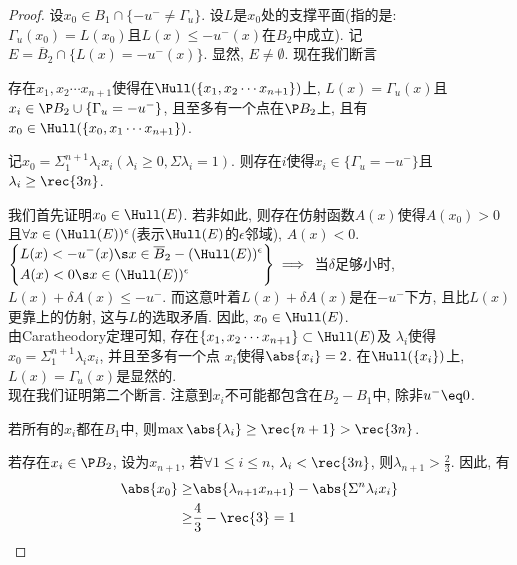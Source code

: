\begin{proof}
    设$x_0 \in B_1 \cap \{-u^- \ne \Gamma_u\}$.  设$L$是$x_0$处的支撑平面(指的是:$\Gamma_u(x_0)=L(x_0)$且$L(x) \le -u^-(x)$在$B_2$中成立).  记$E=\overline{B}_2 \cap \{L(x) =-u^-(x)\}$.  显然, $E \ne \emptyset$.  现在我们断言
    \begin{claim}
        存在$x_1, x_2 \cdots x_{n+1}$使得在$\Hull(\{x_1, x_2\cdots x_{n+1}\})$上, $L(x)=\Gamma_u(x)$且$x_i \in \P B_2 \cup \{\Gamma_u = -u^-\}$, 且至多有一个点在$\P B_2$上, 且有$x_0 \in \Hull(\{x_0, x_1\cdots x_{n+1}\})$.  
    \end{claim}
    \begin{claim}
        记$x_0=\Sigma_1^{n+1}\lambda_i x_i(\lambda_i\ge 0, \Sigma \lambda_i=1)$.  则存在$i$使得$ x_i \in \{\Gamma_u=-u^-\}$且$\lambda_i \ge \rec{3n}$.  
    \end{claim}
    我们首先证明$x_0 \in \Hull(E)$.  若非如此, 则存在仿射函数$A(x)$使得$A(x_0)>0$且$\forall x\in (\Hull(E))^\epsilon$(表示$\Hull(E)$的$\epsilon$邻域), $A(x) <0$.  
    $\left\{ \begin{aligned}
        &L(x) < -u^-(x) \s x \in \overline{B}_2-(\Hull(E))^\epsilon \\
        &A(x) < 0 \s  x \in (\Hull(E))^\epsilon
    \end{aligned}
    \right\}\implies$ 当$\delta$足够小时, $L(x)+\delta A(x) \le -u^-$.  而这意叶着$L(x)+\delta A(x)$是在$-u^-$下方, 且比$L(x)$ 更靠上的仿射, 这与$L$的选取矛盾.  因此, $x_0 \in \Hull(E)$.  \\
    由Caratheodory定理可知, 存在$\{x_1, x_2 \cdots x_{n+1}\} \subset \Hull(E)$及 $\lambda_i$使得 $x_0= \Sigma_1^{n+1}\lambda_i x_i$, 并且至多有一个点 $x_i$使得$\abs{x_i}=2$.  在$\Hull(\{x_i\})$上, $L(x)=\Gamma_u(x)$是显然的.  \\
    现在我们证明第二个断言.  注意到$x_i$不可能都包含在$B_2-B_1$中, 除非$u^- \eq 0$.  
    \par 若所有的$x_i$都在$B_1$中, 则$\max \abs{\lambda_i} \ge \rec{n+1} > \rec{3n}$.  
    \par 若存在$x_i \in \P B_2$, 设为$x_{n+1}$, 若$\forall 1\le i \le n$, $\lambda_i < \rec{3n}$, 则$\lambda_{n+1} > \frac{2}{3}$.  因此, 有
    \begin{equation}
        \begin{split}
            \abs{x_0} \ge&  \abs{\lambda_{n+1}x_{n+1}} - \abs{\Sigma^n \lambda_i x_i} \\
            \ge & \frac{4}{3}-\rec{3} =1
        \end{split}
    \end{equation}

\end{proof}
